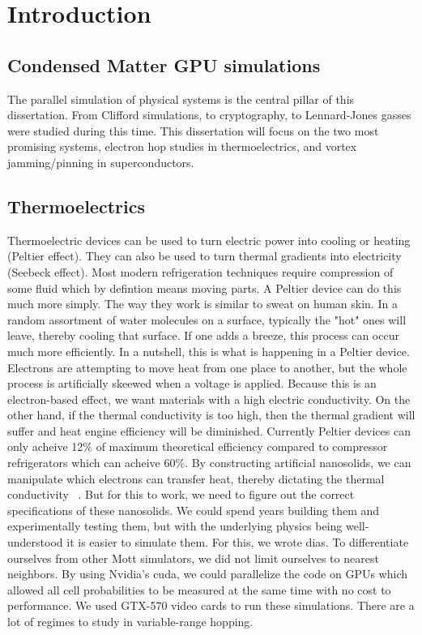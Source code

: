 \chapter{Introduction}		%
\label{introchap}

\label{section}
\section{Condensed Matter GPU simulations}
The parallel simulation of physical systems is the central pillar of this dissertation. From Clifford simulations, to cryptography, to Lennard-Jones gasses were studied during this time. This dissertation will focus on the two most promising systems, electron hop studies in thermoelectrics, and vortex jamming/pinning in superconductors. 

\section{Thermoelectrics}
Thermoelectric devices can be used to turn electric power into cooling or heating (Peltier effect). They can also be used to turn thermal gradients into electricity (Seebeck effect). Most modern refrigeration techniques require compression of some fluid which by defintion means moving parts. A Peltier device can do this much more simply. The way they work is similar to sweat on human skin. In a random assortment of water molecules on a surface, typically the "hot" ones will leave, thereby cooling that surface. If one adds a breeze, this process can occur much more efficiently. In a nutshell, this is what is happening in a Peltier device. Electrons are attempting to move heat from one place to another, but the whole process is artificially skeewed when a voltage is applied. Because this is an electron-based effect, we want materials with a high electric conductivity. On the other hand, if the thermal conductivity is too high, then the thermal gradient will suffer and heat engine efficiency will be diminished. Currently Peltier devices can only acheive 12\% of maximum theoretical efficiency compared to compressor refrigerators which can acheive 60\%. By constructing artificial nanosolids, we can manipulate which electrons can transfer heat, thereby dictating the thermal conductivity ~\cite{glatz09}. But for this to work, we need to figure out the correct specifications of these nanosolids. We could spend years building them and experimentally testing them, but with the underlying physics being well-understood it is easier to simulate them. For this, we wrote {\sc dias}. To differentiate ourselves from other Mott simulators, we did not limit ourselves to nearest neighbors.  By using Nvidia's {\sc cuda}, we could parallelize the code on GPUs which allowed all cell probabilities to be measured at the same time with no cost to performance. We used GTX-570 video cards to run these simulations. There are a lot of regimes to study in variable-range hopping.

